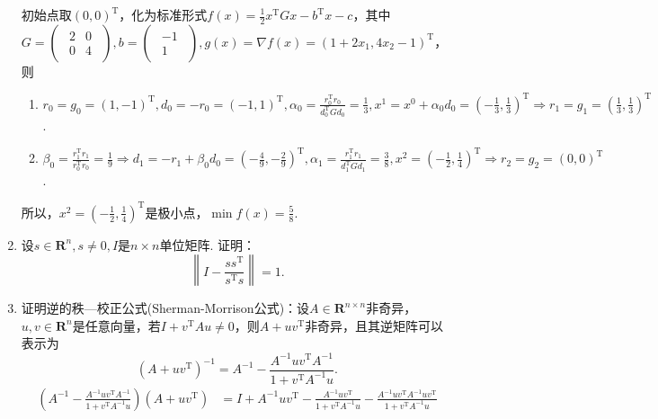 \begin{enumerate}
    \sol 初始点取$(0,0)^\mathrm{T}$，化为标准形式$\displaystyle f(x)=\frac{1}{2}x^\mathrm{T}Gx-b^\mathrm{T}x-c$，其中$\displaystyle G=\left(\begin{array}{cc}
        \begin{matrix}
            2 & 0 \\ 0 & 4
        \end{matrix}
    \end{array}\right),b=\left(\begin{array}{cc}
        \begin{matrix}
            -1 \\ 1
        \end{matrix}
    \end{array}\right),g(x)=\nabla f(x)=(1+2x_1,4x_2-1)^\mathrm{T}$，则
    \begin{enumerate}[label=(\arabic*)]
        \item $\displaystyle r_0=g_0=(1,-1)^\mathrm{T},d_0=-r_0=(-1,1)^\mathrm{T},\alpha_0=\frac{r_0^\mathrm{T}r_0}{d_0^\mathrm{T}Gd_0}=\frac{1}{3},x^1=x^0+\alpha_0d_0=\left(-\frac{1}{3},\frac{1}{3}\right)^\mathrm{T} \Rightarrow r_1=g_1=\left(\frac{1}{3},\frac{1}{3}\right)^\mathrm{T}$.
        \item $\displaystyle \beta_0=\frac{r_1^\mathrm{T}r_1}{r_0^\mathrm{T}r_0}=\frac{1}{9} \Rightarrow d_1=-r_1+\beta_0d_0=\left(-\frac{4}{9},-\frac{2}{9}\right)^\mathrm{T},\alpha_1=\frac{r_1^\mathrm{T}r_1}{d_1^\mathrm{T}Gd_1}=\frac{3}{8},x^2=\left(-\frac{1}{2},\frac{1}{4}\right)^\mathrm{T} \Rightarrow r_2=g_2=(0,0)^\mathrm{T}$.
    \end{enumerate}
    所以，$\displaystyle x^2=\left(-\frac{1}{2},\frac{1}{4}\right)^\mathrm{T}$是极小点，$\displaystyle \min f(x)=\frac{5}{8}$.
    \item 设$s \in \textbf{R}^n,s \neq 0,I$是$n \times n$单位矩阵. 证明：\[\left\|I-\frac{ss^\mathrm{T}}{s^\mathrm{T}s}\right\|=1.\]
    \omitted
    \item 证明逆的秩—校正公式(Sherman-Morrison公式)：设$A \in \textbf{R}^{n \times n}$非奇异，$u,v \in \textbf{R}^n$是任意向量，若$I+v^\mathrm{T}Au \neq 0$，则$A+uv^\mathrm{T}$非奇异，且其逆矩阵可以表示为\[(A+uv^\mathrm{T})^{-1}=A^{-1}-\frac{A^{-1}uv^\mathrm{T}A^{-1}}{1+v^\mathrm{T}A^{-1}u}.\]
    \pro \begin{align*}
        \left(A^{-1}-\frac{A^{-1}uv^\mathrm{T}A^{-1}}{1+v^\mathrm{T}A^{-1}u}\right)(A+uv^\mathrm{T}) & =I+A^{-1}uv^\mathrm{T}-\frac{A^{-1}uv^\mathrm{T}}{1+v^\mathrm{T}A^{-1}u}-\frac{A^{-1}uv^\mathrm{T}A^{-1}uv^\mathrm{T}}{1+v^\mathrm{T}A^{-1}u} \\

\end{align*}
\end{enumerate}
